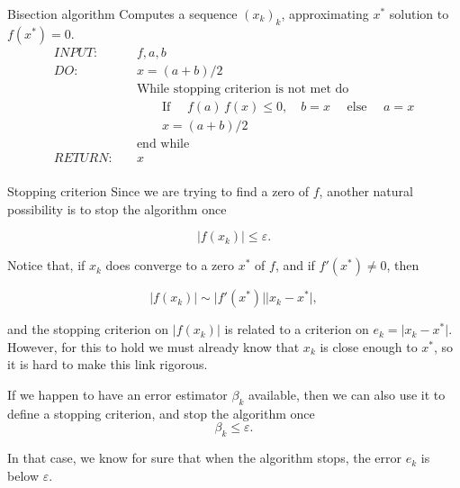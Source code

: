 \documentclass{article}
\begin{document}
        \begin{algo}{Bisection algorithm}
            Computes a sequence $(x_k)_k$, approximating $x^*$ solution to $f(x^*)=0$.
            \begin{align*}
            INPUT:&\quad{} f, a, b\\
            DO:&\quad{} x = (a+b)/2\\
            &\quad{} \text{While stopping criterion is not met do}\\
            &\quad{}\quad{}\quad{} \text{If } \quad{} f(a)\,f(x)\leq 0 ,  \quad{} b=x \quad{}\text{ else }\quad{} a=x\\
            &\quad{}\quad{}\quad{} x = (a+b)/2\\
            &\quad{} \text{end while}\\
            RETURN:&\quad{} x\\
            \end{align*}
        \end{algo}

        \vspace{10pt}

        \begin{other}{Stopping criterion}
            Since we are trying to find a zero of $f$, another natural possibility is to stop the algorithm once 

            $$
            \vert f(x_k)\vert \leq \varepsilon.
            $$
            
            Notice that, if $x_k$ does converge to a zero $x^*$ of $f$, and if $f'(x^*) \neq 0$, then
            
            $$
            \vert f(x_k)\vert \sim \vert f'(x^*) \vert \vert x_k - x^*\vert,
            $$
            
            and the stopping criterion on $\vert f(x_k)\vert$ is related to a criterion on $e_k = \vert x_k - x^*\vert$. However, for this to hold we must already know that $x_k$ is close enough to $x^*$, so it is hard to make this link rigorous.

            \vspace{6pt}
            
            If we happen to have an error estimator $\beta_k$ available, then we can also use it to define a stopping criterion, and stop the algorithm once 
            $$
            \beta_k \leq \varepsilon.
            $$
            
            In that case, we know for sure that when the algorithm stops, the error $e_k$ is below $\varepsilon$.
        \end{other}
\end{document}
